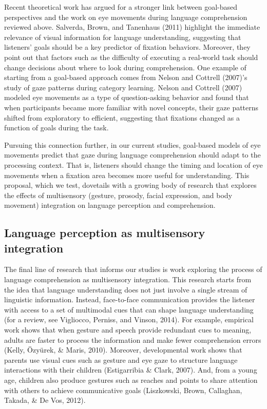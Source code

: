 \documentclass[,man,floatsintext]{apa6}
\begin{document}
Recent theoretical work has argued for a stronger link between
goal-based perspectives and the work on eye movements during language
comprehension reviewed above. Salverda, Brown, and Tanenhaus (2011)
highlight the immediate relevance of visual information for language
understanding, suggesting that listeners' goals should be a key
predictor of fixation behaviors. Moreover, they point out that factors
such as the difficulty of executing a real-world task should change
decisions about where to look during comprehension. One example of
starting from a goal-based approach comes from Nelson and Cottrell
(2007)'s study of gaze patterns during category learning. Nelson and
Cottrell (2007) modeled eye movements as a type of question-asking
behavior and found that when participants became more familiar with
novel concepts, their gaze patterns shifted from exploratory to
efficient, suggesting that fixations changed as a function of goals
during the task.

Pursuing this connection further, in our current studies, goal-based
models of eye movements predict that gaze during language comprehension
should adapt to the processing context. That is, listeners should change
the timing and location of eye movements when a fixation area becomes
more useful for understanding. This proposal, which we test, dovetails
with a growing body of research that explores the effects of
multisensory (gesture, prosody, facial expression, and body movement)
integration on language perception and comprehension.

\subsection{Language perception as multisensory
integration}\label{language-perception-as-multisensory-integration}

The final line of research that informs our studies is work exploring
the process of language comprehension as multisensory integration. This
research starts from the idea that language understanding does not just
involve a single stream of linguistic information. Instead, face-to-face
communication provides the listener with access to a set of multimodal
cues that can shape language understanding (for a review, see Vigliocco,
Perniss, and Vinson, 2014). For example, empirical work shows that when
gesture and speech provide redundant cues to meaning, adults are faster
to process the information and make fewer comprehension errors (Kelly,
Özyürek, \& Maris, 2010). Moreover, developmental work shows that
parents use visual cues such as gesture and eye gaze to structure
language interactions with their children (Estigarribia \& Clark, 2007).
And, from a young age, children also produce gestures such as reaches
and points to share attention with others to achieve communicative goals
(Liszkowski, Brown, Callaghan, Takada, \& De Vos, 2012).
\end{document}
